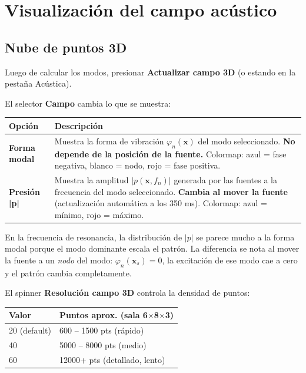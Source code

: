 \documentclass[11pt, a4paper]{article}
\newenvironment{nota}[1][Nota]{%
  \begin{tcolorbox}[mybox=cBlue, title={#1}]%
}{\end{tcolorbox}}
\newcommand{\tecla}[1]{\texttt{\small\fbox{#1}}}
\newcommand{\menu}[1]{\textbf{\guillemotleft #1\guillemotright}}
\begin{document}
\section{Visualización del campo acústico}

\subsection{Nube de puntos 3D}

Luego de calcular los modos, presionar \menu{Actualizar campo 3D} (o
\tecla{Enter} estando en la pestaña Acústica).

El selector \menu{Campo} cambia lo que se muestra:

\begin{tabular}{lp{10cm}}
  \toprule
  Opción & Descripción \\
  \midrule
  \textbf{Forma modal} &
    Muestra la forma de vibración $\varphi_n(\mathbf{x})$ del modo
    seleccionado. \textbf{No depende de la posición de la fuente.}
    Colormap: azul = fase negativa, blanco = nodo, rojo = fase positiva. \\
  \addlinespace
  \textbf{Presión |p|} &
    Muestra la amplitud $|p(\mathbf{x}, f_n)|$ generada por las fuentes
    a la frecuencia del modo seleccionado.
    \textbf{Cambia al mover la fuente} (actualización automática a los 350 ms).
    Colormap: azul = mínimo, rojo = máximo. \\
  \bottomrule
\end{tabular}

\begin{nota}
  En la frecuencia de resonancia, la distribución de $|p|$ se parece mucho
  a la forma modal porque el modo dominante escala el patrón. La diferencia
  se nota al mover la fuente a un \emph{nodo} del modo: $\varphi_n(\mathbf{x}_s) = 0$,
  la excitación de ese modo cae a cero y el patrón cambia completamente.
\end{nota}

El spinner \menu{Resolución campo 3D} controla la densidad de puntos:

\begin{tabular}{ll}
  \toprule
  Valor & Puntos aprox. (sala 6$\times$8$\times$3) \\
  \midrule
  20 (default) & 600 – 1500 pts (rápido) \\
  40           & 5000 – 8000 pts (medio) \\
  60           & 12000+ pts (detallado, lento) \\
  \bottomrule
\end{tabular}
\end{document}
